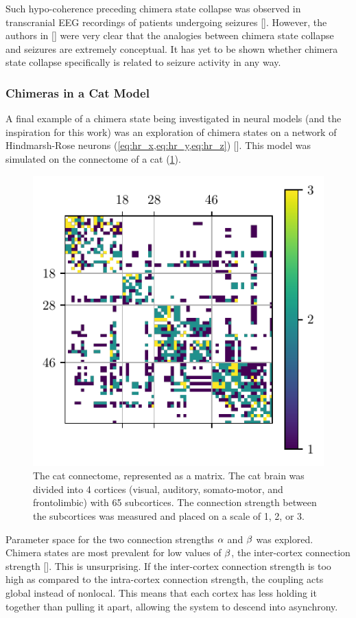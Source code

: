 Such hypo-coherence preceding chimera state collapse was observed in transcranial EEG recordings of patients undergoing seizures [].
However, the authors in [] were very clear that the analogies between chimera state collapse and seizures are extremely conceptual.
It has yet to be shown whether chimera state collapse specifically is related to seizure activity in any way.

\subsubsection{Chimeras in a Cat Model}
\label{sec:lit_review_chimera_cat}
A final example of a chimera state being investigated in neural models (and the inspiration for this work) was an exploration of chimera states on a network of Hindmarsh-Rose neurons (\cref{eq:hr_x,eq:hr_y,eq:hr_z}) [].
This model was simulated on the connectome of a cat (\cref{fig:cat_matrix}).
\begin{figure}[ht]
  \centering
  \includegraphics[width=0.9\columnwidth]{figure/cat_matrix.pdf}
  \caption[Cat connectome]{The cat connectome, represented as a matrix.
    The cat brain was divided into 4 cortices (visual, auditory, somato-motor, and frontolimbic) with 65 subcortices.
    The connection strength between the subcortices was measured and placed on a scale of 1, 2, or 3.
  }
  \label{fig:cat_matrix}
\end{figure}
Parameter space for the two connection strengths $\alpha$ and $\beta$ was explored.
Chimera states are most prevalent for low values of $\beta$, the inter-cortex connection strength [].
This is unsurprising.
If the inter-cortex connection strength is too high as compared to the intra-cortex connection strength, the coupling acts global instead of nonlocal.
This means that each cortex has less holding it together than pulling it apart, allowing the system to descend into asynchrony.

